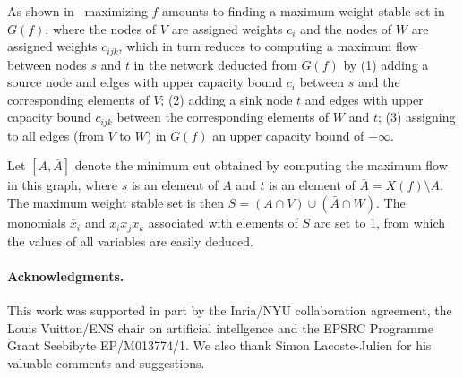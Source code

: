\documentclass[10pt,twocolumn,letterpaper]{article}
\numberwithin{theorem}{section}
\begin{document}
As shown in~\cite{BiMi85} maximizing $f$ amounts to finding a maximum
weight stable set in $G(f)$, where the nodes of $V$ are assigned
weights $c_i$ and the nodes of $W$ are assigned weights $c_{ijk}$,
which in turn reduces to computing a maximum flow between nodes $s$
and $t$ in the network deducted from $G(f)$ by (1) adding a source
node and edges with upper capacity bound $c_i$ between $s$ and the
corresponding elements of $V$; (2) adding a sink node $t$ and edges
with upper capacity bound $c_{ijk}$ between the corresponding elements
of $W$ and $t$; (3) assigning to all edges (from $V$ to $W$) in $G(f)$
an upper capacity bound of $+\infty$.

Let $[A,\bar{A}]$ denote the minimum cut obtained by computing the
maximum flow in this graph, where $s$ is an element of $A$ and $t$ is
an element of $\bar{A}=X(f)\setminus A$. The maximum weight stable set
is then $S=(A\cap V)\cup (\bar{A}\cap W)$. The monomials $\bar{x}_i$
and $x_ix_jx_k$ associated with elements of $S$ are set to 1, from
which the values of all variables are easily deduced.
\vspace{-2mm} \vspace{-2mm}
\paragraph{Acknowledgments.} This work was supported in part by the Inria/NYU collaboration agreement, the Louis Vuitton/ENS chair on artificial intellgence and the EPSRC Programme Grant Seebibyte EP/M013774/1. We also thank Simon Lacoste-Julien for his valuable comments and suggestions.
\end{document}
